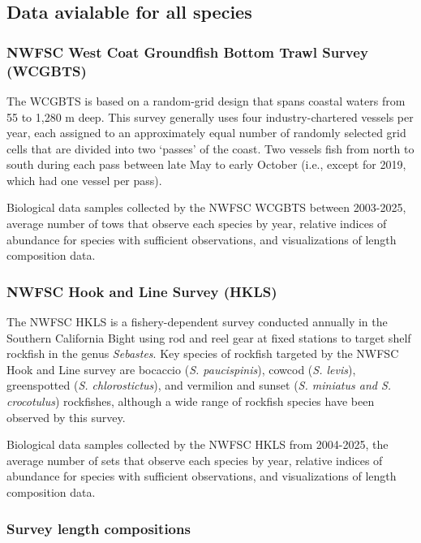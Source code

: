 \documentclass[
  english,
]{article}
\begin{document}
\subsection{Data avialable for all
species}\label{data-avialable-for-all-species}

\subsubsection{NWFSC West Coat Groundfish Bottom Trawl Survey
(WCGBTS)}\label{nwfsc-west-coat-groundfish-bottom-trawl-survey-wcgbts}

The WCGBTS is based on a random-grid design that spans coastal waters
from 55 to 1,280 m deep. This survey generally uses four
industry-chartered vessels per year, each assigned to an approximately
equal number of randomly selected grid cells that are divided into two
`passes' of the coast. Two vessels fish from north to south during each
pass between late May to early October (i.e., except for 2019, which had
one vessel per pass).

Biological data samples collected by the NWFSC WCGBTS between 2003-2025,
average number of tows that observe each species by year, relative
indices of abundance for species with sufficient observations, and
visualizations of length composition data.

\subsubsection{NWFSC Hook and Line Survey
(HKLS)}\label{nwfsc-hook-and-line-survey-hkls}

The NWFSC HKLS is a fishery-dependent survey conducted annually in the
Southern California Bight using rod and reel gear at fixed stations to
target shelf rockfish in the genus \emph{Sebastes}. Key species of
rockfish targeted by the NWFSC Hook and Line survey are bocaccio
(\emph{S. paucispinis}), cowcod (\emph{S. levis}), greenspotted
(\emph{S. chlorostictus}), and vermilion and sunset (\emph{S. miniatus
and S. crocotulus}) rockfishes, although a wide range of rockfish
species have been observed by this survey.

Biological data samples collected by the NWFSC HKLS from 2004-2025, the
average number of sets that observe each species by year, relative
indices of abundance for species with sufficient observations, and
visualizations of length composition data.

\subsubsection{Survey length
compositions}\label{survey-length-compositions}
\end{document}

